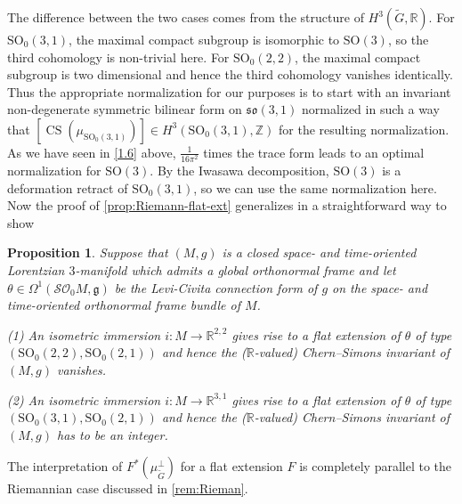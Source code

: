 \documentclass[british,11pt,a4paper]{amsart}
\numberwithin{equation}{section}
\renewcommand\frak{\mathfrak}
\renewcommand\Bbb{\mathbb}
\newcommand\Cal{\mathcal}
\newcommand{\Om}{\Omega}
\newcommand{\CS}{\operatorname{CS}}
\newcommand{\Z}{\mathbb{Z}}
\newcommand*{\R}{\mathbb{R}}
\newcommand{\col}{:}
\newcounter{theorem}
\numberwithin{theorem}{section}
\newtheorem{prop}[theorem]{Proposition}
\theoremstyle{definition}
\theoremstyle{remark}
\begin{document}
The difference between the two cases comes from the structure of $H^3(\tilde G,\Bbb
R)$. For $\mathrm{SO}_0(3,1)$, the maximal compact subgroup is isomorphic to
$\mathrm{SO}(3)$, so the third cohomology is non-trivial here. For
$\mathrm{SO}_0(2,2)$, the maximal compact subgroup is two dimensional and hence the
third cohomology vanishes identically. Thus the appropriate normalization for our
purposes is to start with an invariant non-degenerate symmetric bilinear form on
$\mathfrak{so}(3,1)$ normalized in such a way that
$[\CS(\mu_{\mathrm{SO}_0(3,1)})]\in H^3(\mathrm{SO}_0(3,1),\Z)$ for the resulting
normalization.  As we have seen in \cref{1.6} above,
  $\tfrac{1}{16\pi^2}$ times the trace form leads to an optimal normalization for
  $\mathrm{SO}(3)$. By the Iwasawa decomposition, $\mathrm{SO}(3)$ is a deformation retract
  of $\mathrm{SO}_0(3,1)$, so we can use the same normalization here. Now the proof
of \cref{prop:Riemann-flat-ext} generalizes in a straightforward way to show

\begin{prop}\label{prop:Lorentz-flat-ext}
Suppose that $(M,g)$ is a closed space- and time-oriented Lorentzian $3$-ma\-ni\-fold which admits a global orthonormal frame and let $\theta\in\Om^1(\Cal{SO}_0M,\frak{g})$ be the Levi-Civita connection form of $g$ on the space- and time-oriented orthonormal frame bundle of $M$.

(1) An isometric immersion $i\col M\to \R^{2,2}$ gives rise to a flat extension of
$\theta$ of type $(\mathrm{SO}_0(2,2),\mathrm{SO}_0(2,1))$ and hence the ($\R$-valued) Chern--Simons invariant of
$(M,g)$ vanishes.

(2) An isometric immersion $i\col M\to \R^{3,1}$ gives rise to a flat extension of
$\theta$ of type $(\mathrm{SO}_0(3,1),\mathrm{SO}_0(2,1))$ and hence the ($\R$-valued) Chern--Simons
invariant of $(M,g)$ has to be an integer.
\end{prop}

The interpretation of $F^*(\mu_{\tilde G}^\perp)$ for a flat extension $F$ is
completely parallel to the Riemannian case discussed in \cref{rem:Rieman}. 
\end{document}
